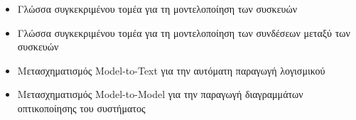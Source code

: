 \begin{itemize}
	\item Γλώσσα συγκεκριμένου τομέα για τη μοντελοποίηση των συσκευών
	\item Γλώσσα συγκεκριμένου τομέα για τη μοντελοποίηση των συνδέσεων μεταξύ των συσκευών
	\item Μετασχηματισμός Model-to-Text για την αυτόματη παραγωγή λογισμικού
	\item Μετασχηματισμός Model-to-Model για την παραγωγή διαγραμμάτων οπτικοποίησης του συστήματος
\end{itemize}







